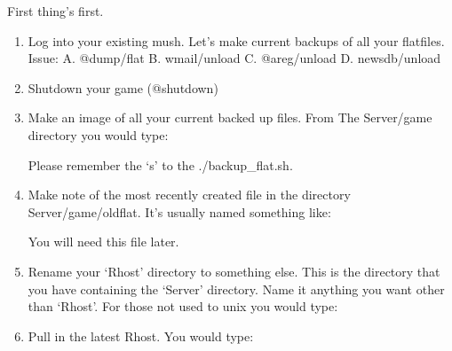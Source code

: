 \documentclass[letterpaper,10pt,english]{sphinxmanual}
\begin{document}
\sphinxAtStartPar
First thing’s first.
\begin{enumerate}
%
\item {} 
\sphinxAtStartPar
Log into your existing mush.  Let’s make current backups
of all your flatfiles.  Issue:
A. @dump/flat
B. wmail/unload
C. @areg/unload
D. newsdb/unload

\item {} 
\sphinxAtStartPar
Shutdown your game (@shutdown)

\item {} 
\sphinxAtStartPar
Make an image of all your current backed up files.  From The Server/game directory you would type:

\begin{sphinxVerbatim}[commandchars=\\\{\}]
 
\end{sphinxVerbatim}

\sphinxAtStartPar
Please remember the ‘\sphinxhyphen{}s’ to the ./backup\_flat.sh.

\item {} 
\sphinxAtStartPar
Make note of the most recently created file in the directory Server/game/oldflat.  It’s usually named something like:

\begin{sphinxVerbatim}[commandchars=\\\{\}]
\end{sphinxVerbatim}

\sphinxAtStartPar
You will need this file later.

\item {} 
\sphinxAtStartPar
Rename your ‘Rhost’ directory to something else.  This is the directory that you have containing the ‘Server’ directory.  Name it anything you want other than ‘Rhost’.  For those not used to unix you would type:

\begin{sphinxVerbatim}[commandchars=\\\{\}]
  
\end{sphinxVerbatim}

\item {} 
\sphinxAtStartPar
Pull in the latest Rhost.  You would type:

\begin{sphinxVerbatim}[commandchars=\\\{\}]
   
\end{sphinxVerbatim}


\end{enumerate}
\end{document}
